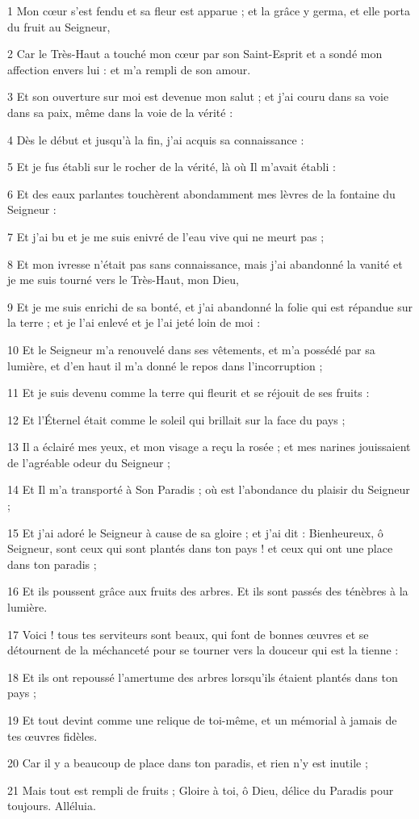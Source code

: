 \par 1 Mon cœur s'est fendu et sa fleur est apparue ; et la grâce y germa, et elle porta du fruit au Seigneur,
\par 2 Car le Très-Haut a touché mon cœur par son Saint-Esprit et a sondé mon affection envers lui : et m'a rempli de son amour.
\par 3 Et son ouverture sur moi est devenue mon salut ; et j'ai couru dans sa voie dans sa paix, même dans la voie de la vérité :
\par 4 Dès le début et jusqu'à la fin, j'ai acquis sa connaissance :
\par 5 Et je fus établi sur le rocher de la vérité, là où Il m'avait établi :
\par 6 Et des eaux parlantes touchèrent abondamment mes lèvres de la fontaine du Seigneur :
\par 7 Et j'ai bu et je me suis enivré de l'eau vive qui ne meurt pas ;
\par 8 Et mon ivresse n'était pas sans connaissance, mais j'ai abandonné la vanité et je me suis tourné vers le Très-Haut, mon Dieu,
\par 9 Et je me suis enrichi de sa bonté, et j'ai abandonné la folie qui est répandue sur la terre ; et je l'ai enlevé et je l'ai jeté loin de moi :
\par 10 Et le Seigneur m'a renouvelé dans ses vêtements, et m'a possédé par sa lumière, et d'en haut il m'a donné le repos dans l'incorruption ;
\par 11 Et je suis devenu comme la terre qui fleurit et se réjouit de ses fruits :
\par 12 Et l'Éternel était comme le soleil qui brillait sur la face du pays ;
\par 13 Il a éclairé mes yeux, et mon visage a reçu la rosée ; et mes narines jouissaient de l'agréable odeur du Seigneur ;
\par 14 Et Il m'a transporté à Son Paradis ; où est l'abondance du plaisir du Seigneur ;
\par 15 Et j'ai adoré le Seigneur à cause de sa gloire ; et j'ai dit : Bienheureux, ô Seigneur, sont ceux qui sont plantés dans ton pays ! et ceux qui ont une place dans ton paradis ;
\par 16 Et ils poussent grâce aux fruits des arbres. Et ils sont passés des ténèbres à la lumière.
\par 17 Voici ! tous tes serviteurs sont beaux, qui font de bonnes œuvres et se détournent de la méchanceté pour se tourner vers la douceur qui est la tienne :
\par 18 Et ils ont repoussé l'amertume des arbres lorsqu'ils étaient plantés dans ton pays ;
\par 19 Et tout devint comme une relique de toi-même, et un mémorial à jamais de tes œuvres fidèles.
\par 20 Car il y a beaucoup de place dans ton paradis, et rien n'y est inutile ;
\par 21 Mais tout est rempli de fruits ; Gloire à toi, ô Dieu, délice du Paradis pour toujours. Alléluia.

